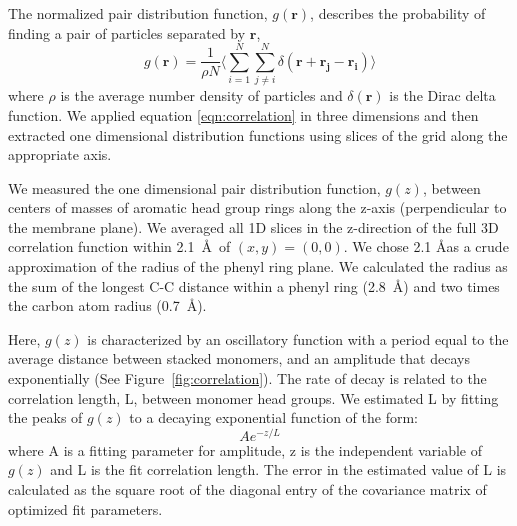 \documentclass[journal=jpcbfk,manusciprt=article]{achemso}
\begin{document}
  The normalized pair distribution function, $g(\mathbf{r})$, describes
  the probability of finding a pair of particles separated by $\mathbf{r}$,
  \begin{equation}
	g(\mathbf{r})= \frac{1}{\rho N} \Bigg \langle \sum_{i=1}^{N}\sum_{j\neq i}^{N} \delta(\mathbf{r}+\mathbf{r_j}-\mathbf{r_i}) \Bigg \rangle
	\label{eqn:correlation}
  \end{equation}
  where $\rho$ is the average number density of particles and
  $\delta(\mathbf{r})$ is the Dirac delta function\cite{kuriabova_linear_2010}.
  We applied equation \ref{eqn:correlation} in three dimensions and then
  extracted one dimensional distribution functions using slices of the grid
  along the appropriate axis.

  We measured the one dimensional pair distribution function, $g(z)$, between centers 
  of masses of aromatic head group rings along the z-axis (perpendicular to
  the membrane plane). We averaged all 1D slices in the z-direction of the full 3D 
  correlation function within 2.1~\AA~of $(x, y)=(0, 0)$. We chose 2.1 \AA as a crude 
  approximation of the radius of the phenyl ring plane. 
  We calculated the radius as the sum of the longest C-C distance within a phenyl 
  ring (2.8~\AA) and two times the carbon atom radius (0.7~\AA).
  
  Here, $g(z)$ is characterized by an oscillatory function with a period equal to the
  average distance between stacked monomers, and an amplitude that decays exponentially
  (See Figure~\ref{fig:correlation}). The rate of decay is related to the correlation 
  length, L, between monomer head groups. We estimated L by fitting the peaks of $g(z)$
  to a decaying exponential function of the form:
  \begin{equation}
  	Ae^{-z/L}
  \end{equation}
  where A is a fitting parameter for amplitude, z is the independent variable of $g(z)$ 
  and L is the fit correlation length. The error in the estimated value of L is 
  calculated as the square root of the diagonal entry of the covariance matrix of 
  optimized fit parameters.


\end{document}

